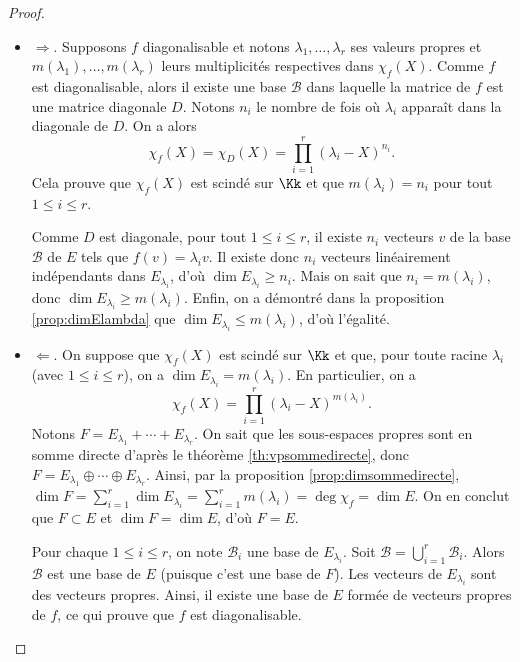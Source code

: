 \documentclass[12pt, class=report,crop=false]{standalone}
\begin{document}
\begin{proof}~
\begin{itemize}

\item $\Longrightarrow$.
Supposons $f$ diagonalisable et notons $\lambda_1,\dots,\lambda_r$ ses valeurs propres et $m(\lambda_1),\ldots,m(\lambda_r)$ leurs multiplicités respectives dans $\chi_f(X)$.
Comme $f$ est diagonalisable, alors il existe une base $\mathcal{B}$ 
dans laquelle la matrice de $f$ est une matrice diagonale $D$.
Notons $n_i$ le nombre de fois où $\lambda_i$ apparaît dans la diagonale de $D$.
On a alors
$$\chi_f(X)=\chi_D(X)=\prod_{i=1}^r(\lambda_i-X)^{n_i}.$$
Cela prouve que $\chi_f(X)$ est scindé sur $\Kk$ 
et que $m(\lambda_i)=n_i$ pour tout $1 \le i \le r$.

Comme $D$ est diagonale, pour tout $1\leq i\leq r$, il existe $n_i$ vecteurs $v$ de la base $\mathcal{B}$ de $E$ 
tels que $f(v)=\lambda_i v$. Il existe donc $n_i$ vecteurs linéairement indépendants dans $E_{\lambda_i}$, d'où 
$\dim E_{\lambda_i}\ge n_i$.
Mais on sait que $n_i=m(\lambda_i)$, donc $\dim E_{\lambda_i}\ge m(\lambda_i)$.
Enfin, on a démontré dans la proposition \ref{prop:dimElambda} que $\dim E_{\lambda_i} \le m(\lambda_i)$, 
d'où l'égalité.



\item $\Longleftarrow$.
On suppose que $\chi_f(X)$ est scindé sur $\Kk$ et que, pour toute racine $\lambda_i$ (avec $1 \le i \le r$), on a 
$\dim E_{\lambda_i}=m(\lambda_i)$. En particulier, on a 
$$\chi_f(X)=\prod_{i=1}^r(\lambda_i-X)^{m(\lambda_i)}.$$
Notons $F=E_{\lambda_1} + \cdots +  E_{\lambda_r}$. On sait que les sous-espaces propres sont en somme directe d'après le théorème \ref{th:vpsommedirecte},
donc $F=E_{\lambda_1} \oplus \cdots \oplus  E_{\lambda_r}$.
Ainsi, par la proposition \ref{prop:dimsommedirecte}, $\dim F = \sum_{i=1}^r \dim E_{\lambda_i} = \sum_{i=1}^r m(\lambda_i) = \deg \chi_f = \dim E$.
On en conclut que $F \subset E$ et $\dim F = \dim E$, d'où $F=E$.

Pour chaque $1\leq i\leq r$, on note $\mathcal{B}_i$ une base de $E_{\lambda_i}$.
Soit $\mathcal{B}=\bigcup_{i=1}^r\mathcal{B}_i$. Alors $\mathcal{B}$ est une base de $E$ (puisque c'est une base de $F$).
Les vecteurs de $E_{\lambda_i}$ sont des vecteurs propres.
Ainsi, il existe une base de $E$ formée de vecteurs propres de $f$, 
ce qui prouve que $f$ est diagonalisable. 

\end{itemize}
\end{proof}
\end{document}

